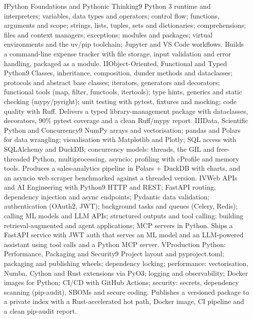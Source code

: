 \unit{I}{Python Foundations and Pythonic Thinking}{9}{%
Python 3 runtime and interpreters; variables, data types and operators; control flow; functions, arguments and scope;
strings, lists, tuples, sets and dictionaries; comprehensions; files and context managers; exceptions;
modules and packages; virtual environments and the uv/pip toolchain; Jupyter and VS Code workflows.}
{Builds a command-line expense tracker with file storage, input validation and error handling, packaged as a module.}
\unit{II}{Object-Oriented, Functional and Typed Python}{9}{%
Classes, inheritance, composition, dunder methods and dataclasses; protocols and abstract base classes;
iterators, generators and decorators; functional tools (map, filter, functools, itertools);
type hints, generics and static checking (mypy/pyright); unit testing with pytest, fixtures and mocking; code quality with Ruff.}
{Delivers a typed library-management package with dataclasses, decorators, 90\% pytest coverage and a clean Ruff/mypy report.}
\unit{III}{Data, Scientific Python and Concurrency}{9}{%
NumPy arrays and vectorisation; pandas and Polars for data wrangling; visualisation with Matplotlib and Plotly;
SQL access with SQLAlchemy and DuckDB; concurrency models: threads, the GIL and free-threaded Python, multiprocessing, asyncio;
profiling with cProfile and memory tools.}
{Produces a sales-analytics pipeline in Polars + DuckDB with charts, and an asyncio web scraper benchmarked against a threaded version.}
\unit{IV}{Web APIs and AI Engineering with Python}{9}{%
HTTP and REST; FastAPI routing, dependency injection and async endpoints; Pydantic data validation; authentication (OAuth2, JWT);
background tasks and queues (Celery, Redis); calling ML models and LLM APIs; structured outputs and tool calling;
building retrieval-augmented and agent applications; MCP servers in Python.}
{Ships a FastAPI service with JWT auth that serves an ML model and an LLM-powered assistant using tool calls and a Python MCP server.}
\unit{V}{Production Python: Performance, Packaging and Security}{9}{%
Project layout and pyproject.toml; packaging and publishing wheels; dependency locking; performance: vectorisation, Numba, Cython and
Rust extensions via PyO3; logging and observability; Docker images for Python; CI/CD with GitHub Actions;
security: secrets, dependency scanning (pip-audit), SBOMs and secure coding.}
{Publishes a versioned package to a private index with a Rust-accelerated hot path, Docker image, CI pipeline and a clean pip-audit report.}

